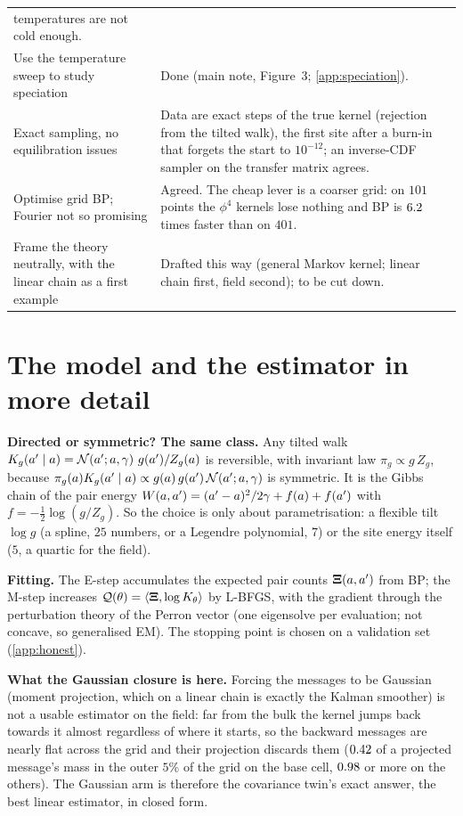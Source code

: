 \documentclass[11pt,a4paper]{article}
\begin{document}
\begin{table}[h]
\begin{tabularx}{\textwidth}{@{}>{\raggedright\arraybackslash}p{}L@{}}
temperatures are not cold enough. \\
Use the temperature sweep to study speciation & Done (main note, Figure~3; \ref{app:speciation}). \\
Exact sampling, no equilibration issues & Data are exact steps of the true kernel (rejection from the tilted walk), the first
site after a burn-in that forgets the start to $10^{-12}$; an inverse-CDF sampler on the transfer matrix agrees. \\
Optimise grid BP; Fourier not so promising & Agreed. The cheap lever is a coarser grid: on $101$ points the $\phi^4$ kernels lose
nothing and BP is $6.2$ times faster than on $401$. \\
Frame the theory neutrally, with the linear chain as a first example & Drafted this way (general Markov kernel; linear chain first,
field second); to be cut down. \\
\bottomrule
\end{tabularx}
\end{table}

\section{The model and the estimator in more detail}
\label{app:model}

\textbf{Directed or symmetric? The same class.} Any tilted walk $K_g(a'\mid a)=\mathcal{N}\!\left(a';a,\gamma\right)\,g(a')/Z_g(a)$ is
reversible, with invariant law $\pi_g\propto g\,Z_g$, because $\pi_g(a)K_g(a'\mid a)\propto g(a)\,g(a')\,\mathcal{N}\!\left(a';a,\gamma\right)$
is symmetric. It is the Gibbs chain of the pair energy $W(a,a')=(a'-a)^2/2\gamma+f(a)+f(a')$ with $f=-\tfrac12\log(g/Z_g)$. So the choice is only about
parametrisation: a flexible tilt $\log g$ (a spline, $25$ numbers, or a Legendre polynomial, $7$) or the site energy itself ($5$,
a quartic for the field).

\textbf{Fitting.} The E-step accumulates the expected pair counts $\mathbf{\Xi}(a,a')$ from BP; the M-step increases
$\mathcal{Q}(\theta)=\langle\mathbf{\Xi},\log K_{\theta}\rangle$ by L-BFGS, with the gradient through the perturbation theory of the Perron vector
(one eigensolve per evaluation; not concave, so generalised EM). The stopping point is chosen on a validation set (\ref{app:honest}).

\textbf{What the Gaussian closure is here.} Forcing the messages to be Gaussian (moment projection, which on a linear chain is
exactly the Kalman smoother) is not a usable estimator on the field: far from the bulk the kernel jumps back towards it almost
regardless of where it starts, so the backward messages are nearly flat across the grid and their projection discards them
($0.42$ of a projected message's mass in the outer $5\%$ of the grid on the base cell, $0.98$ or more
on the others). The Gaussian arm is therefore the covariance twin's exact answer, the best linear estimator, in closed form.
\end{document}
